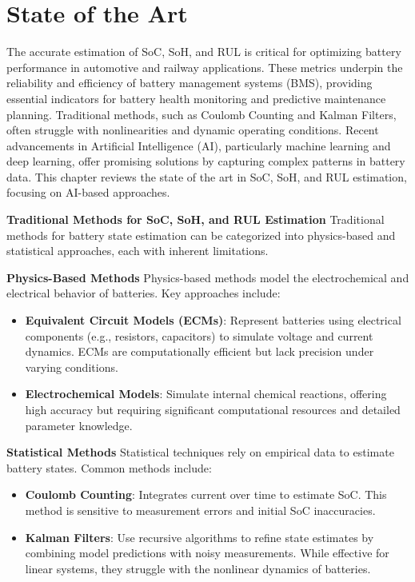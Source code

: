 \chapter{State of the Art}
\label{ch:stateoftheart}
The accurate estimation of SoC, SoH, and RUL is critical for optimizing battery performance in automotive and railway applications. These metrics underpin the reliability and efficiency of battery management systems (BMS), providing essential indicators for battery health monitoring and predictive maintenance planning. Traditional methods, such as Coulomb Counting and Kalman Filters, often struggle with nonlinearities and dynamic operating conditions. Recent advancements in Artificial Intelligence (AI), particularly machine learning and deep learning, offer promising solutions by capturing complex patterns in battery data. This chapter reviews the state of the art in SoC, SoH, and RUL estimation, focusing on AI-based approaches.

\textbf{Traditional Methods for SoC, SoH, and RUL Estimation}
Traditional methods for battery state estimation can be categorized into physics-based and statistical approaches, each with inherent limitations.

\textbf{Physics-Based Methods}
Physics-based methods model the electrochemical and electrical behavior of batteries. Key approaches include:
\begin{itemize}
    \item \textbf{Equivalent Circuit Models (ECMs)}: Represent batteries using electrical components (e.g., resistors, capacitors) to simulate voltage and current dynamics. ECMs are computationally efficient but lack precision under varying conditions.
    \item \textbf{Electrochemical Models}: Simulate internal chemical reactions, offering high accuracy but requiring significant computational resources and detailed parameter knowledge.
\end{itemize}

\textbf{Statistical Methods}
Statistical techniques rely on empirical data to estimate battery states. Common methods include:
\begin{itemize}
    \item \textbf{Coulomb Counting}: Integrates current over time to estimate SoC. This method is sensitive to measurement errors and initial SoC inaccuracies.
    \item \textbf{Kalman Filters}: Use recursive algorithms to refine state estimates by combining model predictions with noisy measurements. While effective for linear systems, they struggle with the nonlinear dynamics of batteries.
\end{itemize}


